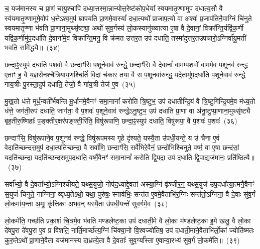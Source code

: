 च॒ यज॑मानस्य च प्रा॒णं चायु॒श्चापि॑ दध्या॒त्तस्मा॒न्नान्योत्त॒रेष्ट॑कोप॒धेया᳚ स्वयमातृ॒ण्णामुप॑ दधात्य॒सौ वै स्व॑यमातृ॒ण्णामूमे॒वोप॑ ध॒त्ते\-ऽश्व॒मुप॑ घ्रापयति प्रा॒णमे॒वास्यां᳚ दधा॒त्यथो᳚ प्राजाप॒त्यो वा अश्वः॑ प्र॒जाप॑तिनै॒वाग्निं चि॑नुते स्वयमातृ॒ण्णा भ॑वति प्रा॒णाना॒मुथ्सृ॑ष्ट्या॒ अथो॑ सुव॒र्गस्य॑ लो॒कस्यानु॑ख्यात्या ए॒षा वै दे॒वानां॒ विक्रा᳚न्ति॒र्यद्वि॑क॒र्णी यद्वि॑क॒र्णीमु॑प॒दधा॑ति दे॒वाना॑मे॒व विक्रा᳚न्ति॒मनु॒ वि क्र॑मत उत्तर॒त उप॑ दधाति॒ तस्मा॑दुत्तर॒तउ॑पचारो॒\-ऽग्निर्वा॑यु॒मती॑ भवति॒ समि॑द्ध्यै॥~(३४)

{\anuvakamend[{सम्भृ॑तं॒ यन्ना॑क॒सदो॒ यन्ना॑क॒सद॒स्तत्प॑शू॒नामे॒षां वै द्वाविꣳ॑शतिश्च}]}%

छन्दा॒ꣴ॒स्युप॑ दधाति प॒शवो॒ वै छन्दाꣳ॑सि प॒शूने॒वाव॑ रुन्द्धे॒ छन्दाꣳ॑सि॒ वै दे॒वानां᳚ वा॒मम्प॒शवो॑ वा॒ममे॒व प॒शूनव॑ रुन्द्ध ए॒ताꣳ ह॒ वै य॒ज्ञसे॑नश्चैत्रियाय॒णश्चितिं॑ वि॒दां च॑कार॒ तया॒ वै स प॒शूनवा॑रुन्द्ध॒ यदे॒तामु॑प॒दधा॑ति प॒शूने॒वाव॑ रुन्द्धे गाय॒त्रीः पु॒रस्ता॒दुप॑ दधाति॒ तेजो॒ वै गा॑य॒त्री तेज॑ ए॒व~(३५)

मु॒ख॒तो ध॑त्ते मूर्ध॒न्वती᳚र्भवन्ति मू॒र्धान॑मे॒वैनꣳ॑ समा॒नानां᳚ करोति त्रि॒ष्टुभ॒ उप॑ दधातीन्द्रि॒यं वै त्रि॒ष्टुगि॑न्द्रि॒यमे॒व म॑ध्य॒तो ध॑त्ते॒ जग॑ती॒रुप॑ दधाति॒ जाग॑ता॒ वै प॒शवः॑ प॒शूने॒वाव॑ रुन्द्धे\-ऽनु॒ष्टुभ॒ उप॑ दधाति प्रा॒णा वा अ॑नु॒ष्टुप्प्रा॒णाना॒मुथ्सृ॑ष्ट्यै बृह॒तीरु॒ष्णिहाः᳚ प॒ङ्क्तीर॒क्षर॑पङ्क्ती॒रिति॒ विषु॑रूपाणि॒ छन्दा॒ꣴ॒स्युप॑ दधाति॒ विषु॑रूपा॒ वै प॒शवः॑ प॒शवः॑~(३६)

छन्दाꣳ॑सि॒ विषु॑रूपाने॒व प॒शूनव॑ रुन्द्धे॒ विषु॑रूपमस्य गृ॒हे दृ॑श्यते॒ यस्यै॒ता उ॑पधी॒यन्ते॒ य उ॑ चैना ए॒वं वेदाति॑च्छन्दस॒मुप॑ दधा॒त्यति॑च्छन्दा॒ वै सर्वा॑णि॒ छन्दाꣳ॑सि॒ सर्वे॑भिरे॒वैनं॒ छन्दो॑भिश्चिनुते॒ वर्ष्म॒ वा ए॒षा छन्द॑सां॒ यदति॑च्छन्दा॒ यदति॑च्छन्दसमुप॒दधा॑ति॒ वर्ष्मै॒वैनꣳ॑ समा॒नानां᳚ करोति द्वि॒पदा॒ उप॑ दधाति द्वि॒पाद्यज॑मानः॒ प्रति॑ष्ठित्यै॥~(३७)

{\anuvakamend[{तेज॑ ए॒व प॒शवः॑ प॒शवो॒ यज॑मान॒ एक॑ञ्च}]}%

सर्वा᳚भ्यो॒ वै दे॒वता᳚भ्यो॒\-ऽग्निश्ची॑यते॒ यथ्स॒युजो॒ नोप॑द॒ध्याद्दे॒वता॑ अस्या॒ग्निं वृ॑ञ्जीर॒न्॒ यथ्स॒युज॑ उप॒दधा᳚त्या॒त्मनै॒वैनꣳ॑ स॒युजं॑ चिनुते॒ नाग्निना॒ व्यृ॑ध्य॒ते\-ऽथो॒ यथा॒ पुरु॑षः॒ स्नाव॑भिः॒ सन्त॑त ए॒वमे॒वैताभि॑र॒ग्निः सन्त॑तो॒\-ऽग्निना॒ वै दे॒वाः सु॑व॒र्गं लो॒कमा॑य॒न्ता अ॒मूः कृ॑त्तिका अभव॒न् यस्यै॒ता उ॑पधी॒यन्ते॑ सुव॒र्गमे॒व~(३८)

लो॒कमे॑ति॒ गच्छ॑ति प्रका॒शं चि॒त्रमे॒व भ॑वति मण्डलेष्ट॒का उप॑ दधाती॒मे वै लो॒का म॑ण्डलेष्ट॒का इ॒मे खलु॒ वै लो॒का दे॑वपु॒रा दे॑वपु॒रा ए॒व प्र वि॑शति॒ नार्ति॒मार्च्छ॑त्य॒ग्निं चि॑क्या॒नो वि॒श्वज्यो॑तिष॒ उप॑ दधाती॒माने॒वैताभि॑र्लो॒कां ज्योति॑ष्मतः कुरु॒ते\-ऽथो᳚ प्रा॒णाने॒वैता यज॑मानस्य दाध्रत्ये॒ता वै दे॒वताः᳚ सुव॒र्ग्या᳚स्ता ए॒वान्वा॒रभ्य॑ सुव॒र्गं लो॒कमे॑ति॥~(३९)

